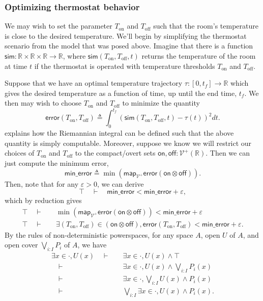 \documentclass{article}           %
\newcommand{\R}{\mathbb{R}}
\newcommand{\Viet}{{\mathcal{V}^+}}
\newcommand{\map}[1]{\mathsf{map}_{#1}}
\newcommand{\defeq}{\triangleq}
\begin{document}
\subsubsection{Optimizing thermostat behavior}

We may wish to set the parameter $T_\text{on}$ and $T_\text{off}$ such that the room's temperature is close to the desired temperature. We'll begin by simplifying the thermostat scenario from the model that was posed above. Imagine that there is a function $\mathsf{sim} : \R \times \R \times \R \to \R$, where $\mathsf{sim}(T_\text{on}, T_\text{off}, t)$ returns the temperature of the room at time $t$ if the thermostat is operated with temperature thresholds $T_\text{on}$ and $T_\text{off}$.

Suppose that we have an optimal temperature trajectory $\tau : [0, t_f] \to \R$ which gives the desired temperature as a function of time, up until the end time, $t_f$. We then may wish to choose $T_\text{on}$ and $T_\text{off}$ to minimize the quantity
\[
\mathsf{error}(T_\text{on}, T_\text{off}) \defeq \int_0^{t_f} (\mathsf{sim}(T_\text{on}, T_\text{off}, t) - \tau(t))^2 dt.
\]
\cite{vickersintegral} explains how the Riemannian integral can be defined such that the above quantity is simply computable. Moreover, suppose we know we will restrict our choices of $T_\text{on}$ and $T_\text{off}$ to the compact/overt sets $\mathsf{on}, \mathsf{off} : \Viet(\R)$. Then we can just compute the minimum error,
\[
\mathsf{min\_error} \defeq \min(\map{\Viet}\mathsf{error}(\mathsf{on} \otimes \mathsf{off})).
\]
Then, note that for any $\varepsilon > 0$, we can derive
\[
\top \quad \vdash \quad \mathsf{min\_error} < \mathsf{min\_error} + \varepsilon,
\]
which by reduction gives
\begin{align*}
\top \quad \vdash \quad &\min(\map{\Viet}\mathsf{error}(\mathsf{on} \otimes \mathsf{off})) < \mathsf{min\_error} + \varepsilon
\\ \top \quad \vdash \quad &\exists (T_\text{on}, T_\text{off}) \in (\mathsf{on} \otimes \mathsf{off}), \mathsf{error}(T_\text{on}, T_\text{off}) < \mathsf{min\_error} + \varepsilon.
\end{align*}
By the rules of non-deterministic powerspaces, for any space $A$, open $U$ of $A$, and open cover $\bigvee_{i : I} P_i$ of $A$, we have
\begin{align*}
\exists x \in \cdot, U(x)
  \quad \vdash \quad
  &\exists x \in \cdot, U(x) \wedge \top
\\
  \quad \vdash \quad
  &\exists x \in \cdot, U(x) \wedge \bigvee_{i : I} P_i(x)
\\
  \quad \vdash \quad
  &\exists x \in \cdot, \bigvee_{i : I} U(x) \wedge P_i(x)
\\
  \quad \vdash \quad
  &\bigvee_{i : I} \exists x \in \cdot, U(x) \wedge P_i(x).
\end{align*}
\end{document}
